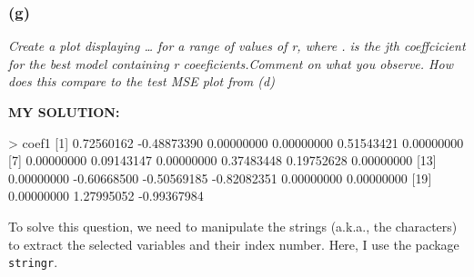 \documentclass[
]{article}
\newenvironment{Shaded}{\begin{snugshade}}{\end{snugshade}}
\newcommand{\DecValTok}[1]{\textcolor[rgb]{0.00,0.00,0.81}{#1}}
\newcommand{\FloatTok}[1]{\textcolor[rgb]{0.00,0.00,0.81}{#1}}
\newcommand{\NormalTok}[1]{#1}
\newcommand{\SpecialCharTok}[1]{\textcolor[rgb]{0.00,0.00,0.00}{#1}}
\begin{document}
\hypertarget{g}{%
\subsubsection{(g)}\label{g}}

\emph{Create a plot displaying \ldots{} for a range of values of r,
where . is the jth coeffcicient for the best model containing r
coeeficients.Comment on what you observe. How does this compare to the
test MSE plot from (d) }

\textbf{MY SOLUTION:}

\begin{Shaded}
\begin{Highlighting}[]
\SpecialCharTok{\textgreater{}}\NormalTok{ coef1}
\NormalTok{ [}\DecValTok{1}\NormalTok{]  }\FloatTok{0.72560162} \SpecialCharTok{{-}}\FloatTok{0.48873390}  \FloatTok{0.00000000}  \FloatTok{0.00000000}  \FloatTok{0.51543421}  \FloatTok{0.00000000}
\NormalTok{ [}\DecValTok{7}\NormalTok{]  }\FloatTok{0.00000000}  \FloatTok{0.09143147}  \FloatTok{0.00000000}  \FloatTok{0.37483448}  \FloatTok{0.19752628}  \FloatTok{0.00000000}
\NormalTok{[}\DecValTok{13}\NormalTok{]  }\FloatTok{0.00000000} \SpecialCharTok{{-}}\FloatTok{0.60668500} \SpecialCharTok{{-}}\FloatTok{0.50569185} \SpecialCharTok{{-}}\FloatTok{0.82082351}  \FloatTok{0.00000000}  \FloatTok{0.00000000}
\NormalTok{[}\DecValTok{19}\NormalTok{]  }\FloatTok{0.00000000}  \FloatTok{1.27995052} \SpecialCharTok{{-}}\FloatTok{0.99367984}
\end{Highlighting}
\end{Shaded}

To solve this question, we need to manipulate the strings (a.k.a., the
characters) to extract the selected variables and their index number.
Here, I use the package \texttt{stringr}.
\end{document}

